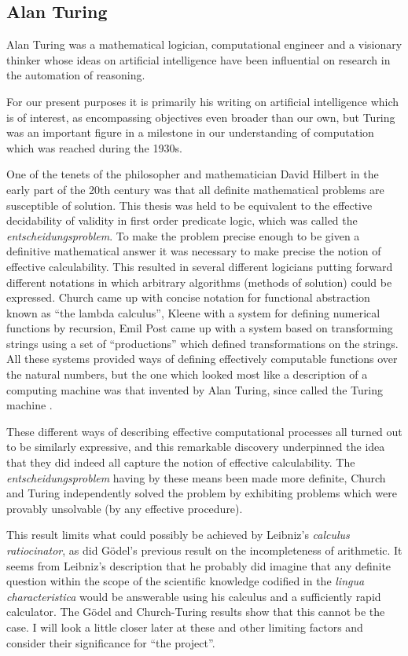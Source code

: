 \subsection{Alan Turing}

Alan Turing was a mathematical logician, computational engineer and a
visionary thinker whose ideas on artificial intelligence have been
influential on research in the automation of reasoning.

For our present purposes it is primarily his writing on artificial
intelligence which is of interest, as encompassing objectives even
broader than our own, but Turing was an important figure in a
milestone in our understanding of computation which was reached during
the 1930s.

One of the tenets of the philosopher and mathematician David Hilbert
in the early part of the 20th century was that all definite
mathematical problems are susceptible of solution.
This thesis was held to be equivalent to the effective decidability of
validity in first order predicate logic, which was called the \emph{entscheidungsproblem}.
To make the problem precise enough to be given a definitive
mathematical answer it was necessary to make precise the notion of effective calculability.
This resulted in several different logicians putting forward different
notations in which arbitrary algorithms (methods of solution) could be
expressed.
Church came up with concise notation for functional abstraction known
as ``the lambda calculus'', Kleene with a system for defining
numerical functions by recursion, Emil Post came up with a system
based on transforming strings using a set of ``productions'' which
defined transformations on the strings.
All these systems provided ways of defining effectively computable
functions over the natural numbers, but the one which looked most like
a description of a computing machine was that invented by Alan Turing,
since called the Turing machine \cite{turingOCN}.

These different ways of describing effective computational processes
all turned out to be similarly expressive, and this remarkable
discovery underpinned the idea that they did indeed all capture the
notion of effective calculability.
The \emph{entscheidungsproblem} having by these means been made more
definite, Church and Turing independently solved the problem by
exhibiting problems which were provably unsolvable (by any effective procedure).

This result limits what could possibly be achieved by Leibniz's
\emph{calculus ratiocinator}, as did G\"odel's previous result on the
incompleteness of arithmetic.
It seems from Leibniz's description that he probably did imagine that
any definite question within the scope of the scientific knowledge
codified in the \emph{lingua characteristica} would be answerable
using his calculus and a sufficiently rapid calculator.
The G\"odel and Church-Turing results show that this cannot be the case.
I will look a little closer later at these and other limiting factors
and consider their significance for ``the project''.

